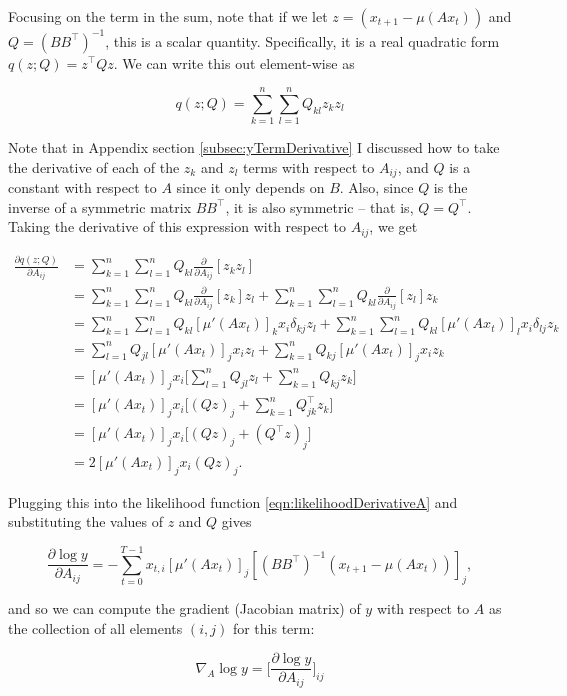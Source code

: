 \documentclass{article}
\theoremstyle{definition}
\begin{document}
Focusing on the term in the sum, note that if we let $z = (x_{t+1} - \mu(Ax_t))$ and $Q = (BB^\top)^{-1}$, this is a scalar quantity. Specifically, it is a real quadratic form $q(z; Q) = z^\top Q z$. We can write this out element-wise as

\[
q(z; Q) = \sum_{k=1}^{n} \sum_{l=1}^{n} Q_{kl} z_k z_l
\]

Note that in Appendix section \ref{subsec:yTermDerivative} I discussed how to take the derivative of each of the $z_k$ and $z_l$ terms with respect to $A_{ij}$, and $Q$ is a constant with respect to $A$ since it only depends on $B$. Also, since $Q$ is the inverse of a symmetric matrix $BB^\top$, it is also symmetric -- that is, $Q=Q^\top$. Taking the derivative of this expression with respect to $A_{ij}$, we get

\begin{equation}
    \begin{split}
    \frac{\partial q(z; Q)}{\partial A_{ij}} & = \sum_{k=1}^{n} \sum_{l=1}^{n} Q_{kl} \frac{\partial}{\partial A_{ij}} [z_k z_l] \\
    & = \sum_{k=1}^{n} \sum_{l=1}^{n} Q_{kl} \frac{\partial}{\partial A_{ij}} [z_k] z_l+ \sum_{k=1}^{n} \sum_{l=1}^{n} Q_{kl} \frac{\partial}{\partial A_{ij}} [z_l] z_k \\
    &= \sum_{k=1}^{n} \sum_{l=1}^{n} Q_{kl} [\mu'(Ax_t)]_k x_i \delta_{kj} z_l + \sum_{k=1}^{n} \sum_{l=1}^{n} Q_{kl} [\mu'(Ax_t)]_l x_i \delta_{lj} z_k \\ 
    & = \sum_{l=1}^{n} Q_{jl} [\mu'(Ax_t)]_j x_i z_l + \sum_{k=1}^{n}  Q_{kj} [\mu'(Ax_t)]_j x_i z_k \\ 
    & =  [\mu'(Ax_t)]_j x_i \big[\sum_{l=1}^{n} Q_{jl} z_l +  \sum_{k=1}^{n}  Q_{kj} z_k \big] \\ 
    & = [\mu'(Ax_t)]_j x_i \big[(Qz)_j +  \sum_{k=1}^{n}  Q^\top_{jk} z_k \big] \\ 
    & = [\mu'(Ax_t)]_j x_i \big[(Qz)_j +  (Q^\top z)_j \big] \\ 
    & = 2 [\mu'(Ax_t)]_j x_i (Qz)_j.
\end{split}
\end{equation}

Plugging this into the likelihood function \ref{eqn:likelihoodDerivativeA} and substituting the values of $z$ and $Q$ gives

\begin{equation}
    \label{eqn:gradAElementWise}
    \frac{\partial \log y}{\partial A_{ij}} = - \sum_{t=0}^{T-1} x_{t,i} [\mu'(Ax_t)]_j [(BB^\top)^{-1} (x_{t+1} - \mu(Ax_t))]_j,
\end{equation}

and so we can compute the gradient (Jacobian matrix) of $y$ with respect to $A$ as the collection of all elements $(i,j)$ for this term:

\begin{equation}
    \nabla_A \log y = \bigg[\frac{\partial \log y}{\partial A_{ij}} \bigg]_{ij}
\end{equation}

\newpage 

\printbibliography
\end{document}

